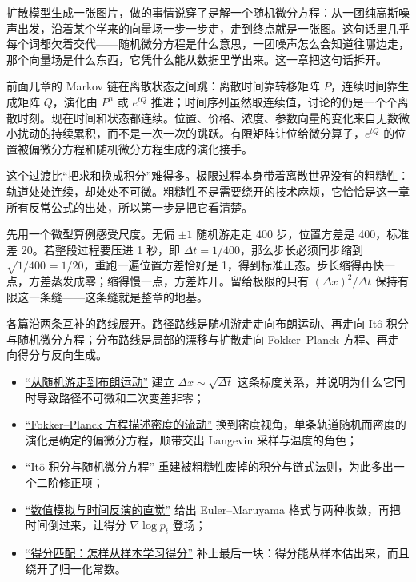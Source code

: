 扩散模型生成一张图片，做的事情说穿了是解一个随机微分方程：从一团纯高斯噪声出发，沿着某个学来的向量场一步一步走，走到终点就是一张图。这句话里几乎每个词都欠着交代——随机微分方程是什么意思，一团噪声怎么会知道往哪边走，那个向量场是什么东西，它凭什么能从数据里学出来。这一章把这句话拆开。

前面几章的 Markov 链在离散状态之间跳：离散时间靠转移矩阵 \(P\)，连续时间靠生成矩阵 \(Q\)，演化由 \(P^n\) 或 \(e^{tQ}\) 推进；时间序列虽然取连续值，讨论的仍是一个个离散时刻。现在时间和状态都连续。位置、价格、浓度、参数向量的变化来自无数微小扰动的持续累积，而不是一次一次的跳跃。有限矩阵让位给微分算子，\(e^{tQ}\) 的位置被偏微分方程和随机微分方程生成的演化接手。

这个过渡比``把求和换成积分''难得多。极限过程本身带着离散世界没有的粗糙性：轨道处处连续，却处处不可微。粗糙性不是需要绕开的技术麻烦，它恰恰是这一章所有反常公式的出处，所以第一步是把它看清楚。

先用一个微型算例感受尺度。无偏 \(\pm1\) 随机游走走 400 步，位置方差是 400，标准差 20。若整段过程要压进 1 秒，即 \(\Delta t=1/400\)，那么步长必须同步缩到 \(\sqrt{1/400}=1/20\)，重跑一遍位置方差恰好是 1，得到标准正态。步长缩得再快一点，方差蒸发成零；缩得慢一点，方差炸开。留给极限的只有 \((\Delta x)^2/\Delta t\) 保持有限这一条缝——这条缝就是整章的地基。

各篇沿两条互补的路线展开。路径路线是随机游走走向布朗运动、再走向 Itô 积分与随机微分方程；分布路线是局部的漂移与扩散走向 Fokker--Planck 方程、再走向得分与反向生成。

\begin{itemize}
\tightlist
\item \hyperref[sec:06-Random-Processes/06-Diffusion-and-SDE/01]{``从随机游走到布朗运动''} 建立 \(\Delta x\sim\sqrt{\Delta t}\) 这条标度关系，并说明为什么它同时导致路径不可微和二次变差非零；
\item \hyperref[sec:06-Random-Processes/06-Diffusion-and-SDE/02]{``Fokker--Planck 方程描述密度的流动''} 换到密度视角，单条轨道随机而密度的演化是确定的偏微分方程，顺带交出 Langevin 采样与温度的角色；
\item \hyperref[sec:06-Random-Processes/06-Diffusion-and-SDE/03]{``Itô 积分与随机微分方程''} 重建被粗糙性废掉的积分与链式法则，为此多出一个二阶修正项；
\item \hyperref[sec:06-Random-Processes/06-Diffusion-and-SDE/04]{``数值模拟与时间反演的直觉''} 给出 Euler--Maruyama 格式与两种收敛，再把时间倒过来，让得分 \(\nabla\log p_t\) 登场；
\item \hyperref[sec:06-Random-Processes/06-Diffusion-and-SDE/05]{``得分匹配：怎样从样本学习得分''} 补上最后一块：得分能从样本估出来，而且绕开了归一化常数。
\end{itemize}

